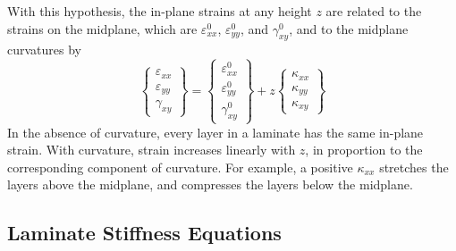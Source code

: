 \documentclass[11pt]{article}
\begin{document}
With this hypothesis, the in-plane strains at any height $z$ are related to the strains on the midplane, which are $\varepsilon^0_{xx}$, $\varepsilon^0_{yy}$, and $\gamma^0_{xy}$, and to the midplane curvatures by
\begin{equation}
\renewcommand\arraystretch{1.2}
        \left\{ \begin{array}{c}
           \varepsilon_{xx}  \\  \varepsilon_{yy}  \\  \gamma_{xy}
           \end{array} \right\}
           =
        \left\{ \begin{array}{c}
           \varepsilon^0_{xx}  \\  \varepsilon^0_{yy}  \\  \gamma^0_{xy}
           \end{array} \right\}
           + z
        \left\{ \begin{array}{c}
           \kappa_{xx}  \\  \kappa_{yy}  \\  \kappa_{xy}
           \end{array} \right\}
     \label{Kirchoff}
\end{equation}
In the absence of curvature, every layer in a laminate has the same in-plane strain.  With curvature, strain increases linearly with $z$, in proportion to the corresponding component of curvature.  For example, a positive $\kappa_{xx}$ stretches the layers above the midplane, and compresses the layers below the midplane.  

\subsection*{Laminate Stiffness Equations}
\end{document}
